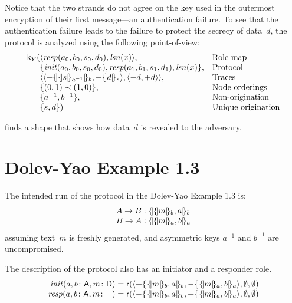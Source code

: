 \documentclass[12pt]{report}
\theoremstyle{definition}
\newcommand{\role}{\mathsf{r}}
\newcommand{\skel}{\mathsf{k}}
\newcommand{\lsn}{\fn{lsn}}
\newcommand{\init}{\fn{init}}
\newcommand{\resp}{\fn{resp}}
\begin{document}
Notice that the two strands do not agree on the key used in the outermost
encryption of their first message---an authentication failure.  To see
that the authentication failure leads to the failure to protect the
secrecy of data~$d$, the protocol is analyzed using the following
point-of-view:
$$\begin{array}{r@{}ll}
\skel_Y(
&\seq{\resp(a_0,b_0,s_0,d_0),\lsn(x)},
&\mbox{Role map}\\
&\{\init(a_0,b_0,s_0,d_0),\resp(a_1,b_1,s_1,d_1),\lsn(x)\},
&\mbox{Protocol}\\
&\seq{
\seq{\inbnd\enc{\enc{s}{a^{-1}}}{b},\outbnd\enc{d}{s}},
\seq{\inbnd d,\outbnd d}},
&\mbox{Traces}\\
&\{(0,1)\prec(1,0)\},
&\mbox{Node orderings}\\
&\{a^{-1},b^{-1}\},
&\mbox{Non-origination}\\
&\{s,d\})
&\mbox{Unique origination}
\end{array}$$

{\cpsa} finds a shape that shows how data~$d$ is revealed to the adversary.

\section{Dolev-Yao Example 1.3}

The intended run of the protocol in the Dolev-Yao Example 1.3 is:
$$\begin{array}{r@{{}:{}}l}
A\to B&\enc{\enc{m}{b},a}{b}\\
B\to A&\enc{\enc{m}{a},b}{a}
\end{array}$$
assuming text~$m$ is freshly generated, and asymmetric keys $a^{-1}$
and $b^{-1}$ are uncompromised.

The {\cpsa} description of the protocol also has an initiator and a
responder role.
$$\begin{array}{r@{{}={}}l}
\init(a,b\colon\srt{A}, m\colon\srt{D})&
\role(\seq{\outbnd\enc{\enc{m}{b},a}{b},\inbnd\enc{\enc{m}{a},b}{a}},
\emptyset,\emptyset)\\
\resp(a,b\colon\srt{A}, m\colon\top)&
\role(\seq{\inbnd\enc{\enc{m}{b},a}{b},\outbnd\enc{\enc{m}{a},b}{a}},
\emptyset,\emptyset)\\
\end{array}$$
\end{document}
